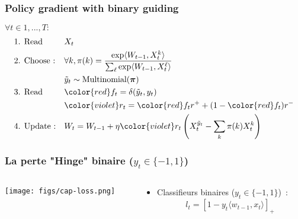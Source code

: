 \documentclass{beamer}
\begin{document}
\begin{frame}\frametitle{Policy gradient {\color{red} with binary guiding}}
	\begin{block}{}
		$\forall t \in 1,...,T :$
		\begin{align*}
		&\text{1. Read } 
		&& X_t 
		\\
		&\text{2. Choose :} 
		&& \forall k, \pi(k) = \frac{\exp\langle W_{t-1}, X_t^k\rangle}{\sum_{\ell}\exp\langle W_{t-1}, X_t^\ell\rangle}
		\\
		&
		&& \tilde{y}_t \sim \text{Multinomial}(\boldsymbol{\pi})
		\\
		&\text{3. Read } 
		&& {\color{red} f_t = \delta(\tilde{y}_t ,y_t)} 
		\\
		&
		&& {\color{violet}r_t} =  {\color{red} f_t} r^+ +(1-{\color{red} f_t}) r^-
		\\
		&\text{4. Update :} 
		&& W_t = W_{t-1} + \eta {\color{violet}r_t} \left(X_t^{\tilde{y}_t} - \sum_k \pi(k) X_t^k \right) 
		\end{align*}
	\end{block}	
	
\end{frame}

	

\begin{frame}
	\frametitle{La perte "Hinge" binaire ($y_t \in \{-1,1\}$)}
	\begin{columns}
		\begin{column}{.2 \linewidth}
			\centerline{\texttt{[image: figs/cap-loss.png]}}
		\end{column}
		\begin{column}{.8 \linewidth}
			\begin{itemize}
				\item Classifieurs binaires ($y_t \in \{-1,1\}$)~:
				$$ l_t = \left[1 - y_t \langle w_{t-1}, x_t \rangle \right]_+$$
			
			\end{itemize}
		\end{column}		
	\end{columns}
\end{frame}
\end{document}
